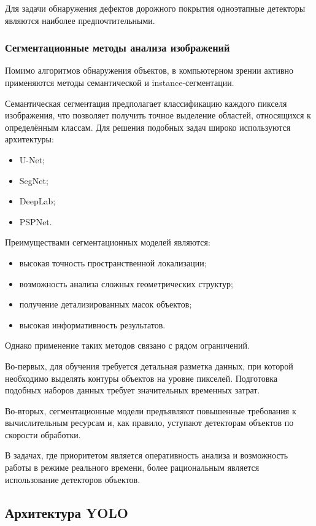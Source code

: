 Для задачи обнаружения дефектов дорожного покрытия одноэтапные детекторы являются наиболее предпочтительными.

\subsubsection{Сегментационные методы анализа изображений}

Помимо алгоритмов обнаружения объектов, в компьютерном зрении активно применяются методы семантической и instance-сегментации.

Семантическая сегментация предполагает классификацию каждого пикселя изображения, что позволяет получить точное выделение областей, относящихся к определённым классам. Для решения подобных задач широко используются архитектуры:

\begin{itemize}
	\item U-Net;
	\item SegNet;
	\item DeepLab;
	\item PSPNet.
\end{itemize}

Преимуществами сегментационных моделей являются:

\begin{itemize}
	\item высокая точность пространственной локализации;
	\item возможность анализа сложных геометрических структур;
	\item получение детализированных масок объектов;
	\item высокая информативность результатов.
\end{itemize}

Однако применение таких методов связано с рядом ограничений.

Во-первых, для обучения требуется детальная разметка данных, при которой необходимо выделять контуры объектов на уровне пикселей. Подготовка подобных наборов данных требует значительных временных затрат.

Во-вторых, сегментационные модели предъявляют повышенные требования к вычислительным ресурсам и, как правило, уступают детекторам объектов по скорости обработки.

В задачах, где приоритетом является оперативность анализа и возможность работы в режиме реального времени, более рациональным является использование детекторов объектов.

\subsection{Архитектура YOLO}

